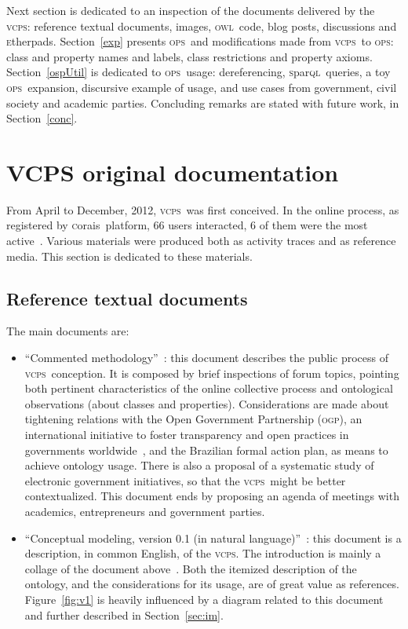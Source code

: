 \documentclass[10pt,letterpaper]{article}
\newcommand{\ops}{\textsc{ops}}
\newcommand{\vcps}{\textsc{vcps}}
\newcommand{\owl}{\textsc{owl}}
\newcommand{\sparql}{\textsc{s}par\textsc{ql}}
\newcommand{\etherpad}{\textsc{e}therpad}
\newcommand{\ogp}{\textsc{ogp}}
\newcommand{\corais}{\textsc{c}orais}
\begin{document}
Next section is dedicated to an inspection of the documents delivered by the \vcps: reference textual documents, images, \owl\ code, blog posts, discussions and \etherpad s. Section~\ref{exp} presents \ops\ and modifications made from \vcps\ to \ops: class and property names and labels, class restrictions and property axioms. Section~\ref{ospUtil} is dedicated to \ops\ usage: dereferencing, \sparql\ queries, a toy \ops\ expansion, discursive example of usage, and use cases from government, civil society and academic parties. Concluding remarks are stated with future work, in Section~\ref{conc}. 


\section{VCPS original documentation}\label{sec:orig}
From April to December, 2012, \vcps\ was first conceived. In the online process, as registered by \corais\ platform, 66 users interacted, 6 of them were the most active~\cite{metodologia}. Various materials were produced both as activity traces and as reference media. This section is dedicated to these materials.

\subsection{Reference textual documents}\label{refDocs}
The main documents are:
\begin{itemize}
    \item ``Commented methodology''~\cite{metodologia}: this document describes the public process of \vcps\ conception. It is composed by brief inspections of forum topics, pointing both pertinent characteristics of the online collective process and ontological observations (about classes and properties). Considerations are made about tightening relations with the Open Government Partnership (\ogp), an international initiative to foster transparency and open practices in governments worldwide~\cite{OGP}, and the Brazilian formal action plan, as means to achieve ontology usage. 
     There is also a proposal of a systematic study of electronic government initiatives, so that the \vcps\ might be better contextualized. This document ends by proposing an agenda of meetings with academics, entrepreneurs and government parties.
 \item ``Conceptual modeling, version 0.1 (in natural language)''~\cite{conceptualMod}: this document is a description, in common English, of the \vcps. The introduction is mainly a collage of the document above~\cite{metodologia}. Both the itemized description of the ontology, and the considerations for its usage, are of great value as references. Figure~\ref{fig:v1} is heavily influenced by a diagram related to this document and further described in Section~\ref{sec:im}.
\end{itemize}
\end{document}
